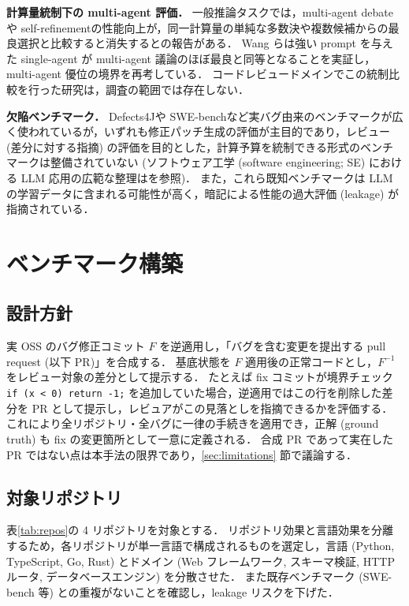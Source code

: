 \documentclass[a4j]{jarticle}
\begin{document}
\textbf{計算量統制下の multi-agent 評価．}
一般推論タスクでは，multi-agent debate\cite{mad}や self-refinement\cite{reflexion}の性能向上が，同一計算量の単純な多数決や複数候補からの最良選択と比較すると消失するとの報告がある．
Wang らは強い prompt を与えた single-agent が multi-agent 議論のほぼ最良と同等となることを実証し，multi-agent 優位の境界を再考している\cite{wang2024rethinkingboundsllmreasoning}．
コードレビュードメインでこの統制比較を行った研究は，調査の範囲では存在しない．

\textbf{欠陥ベンチマーク．}
Defects4J\cite{defects4j}や SWE-bench\cite{swebench}など実バグ由来のベンチマークが広く使われているが，いずれも修正パッチ生成の評価が主目的であり，レビュー (差分に対する指摘) の評価を目的とした，計算予算を統制できる形式のベンチマークは整備されていない (ソフトウェア工学 (software engineering; SE) における LLM 応用の広範な整理は\cite{zhang2024surveylargelanguagemodels}を参照)．
また，これら既知ベンチマークは LLM の学習データに含まれる可能性が高く，暗記による性能の過大評価 (leakage) が指摘されている．

\section{ベンチマーク構築}

\subsection{設計方針}

実 OSS のバグ修正コミット $F$ を逆適用し，「バグを含む変更を提出する pull request (以下 PR)」を合成する．
基底状態を $F$ 適用後の正常コードとし，$F^{-1}$ をレビュー対象の差分として提示する．
たとえば fix コミットが境界チェック \verb|if (x < 0) return -1;| を追加していた場合，逆適用ではこの行を削除した差分を PR として提示し，レビュアがこの見落としを指摘できるかを評価する．
これにより全リポジトリ・全バグに一律の手続きを適用でき，正解 (ground truth) も fix の変更箇所として一意に定義される．
合成 PR であって実在した PR ではない点は本手法の限界であり，\ref{sec:limitations} 節で議論する．

\subsection{対象リポジトリ}

表\ref{tab:repos}の 4 リポジトリを対象とする．
リポジトリ効果と言語効果を分離するため，各リポジトリが単一言語で構成されるものを選定し，言語 (Python, TypeScript, Go, Rust) とドメイン (Web フレームワーク, スキーマ検証, HTTP ルータ, データベースエンジン) を分散させた．
また既存ベンチマーク (SWE-bench 等) との重複がないことを確認し，leakage リスクを下げた．
\end{document}

